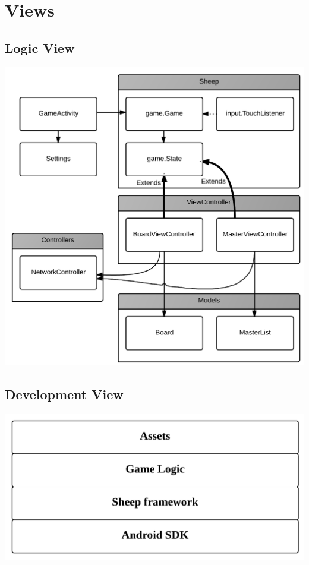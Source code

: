 \section{Views} 
\label{sec:views}

\subsection{Logic View}
\begin{center}
\includegraphics[clip=true, width=0.9 \textwidth]{assets/LogicView.png}
\label{ref:gantt}
\end{center}
\subsection{Development View}
\begin{center}
\includegraphics[clip=true, width=0.9 \textwidth]{assets/DevelopmentView.png}
\label{ref:gantt}
\end{center}
